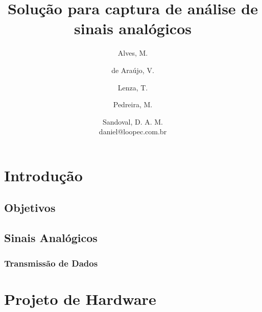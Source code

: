 \documentclass[12pt,a4paper]{report}
\title{Solução para captura de análise de sinais analógicos}
\author{Alves, M.\\
	\and
	de Araújo, V.\\
	\and
	Lenza, T.\\
	\and
	Pedreira, M.\\
	\and
	Sandoval, D. A. M.\\
	daniel@loopec.com.br}
\begin{document}
\maketitle
\tableofcontents

\chapter{Introdução}


\section{Objetivos}


\section{Sinais Analógicos}


\subsection{Transmissão de Dados}


\chapter{Projeto de Hardware}

\end{document}
